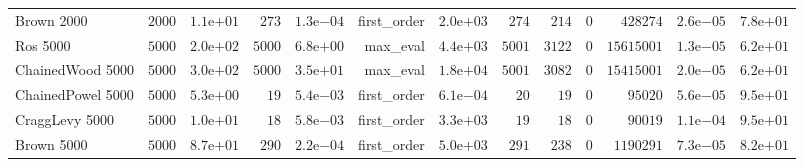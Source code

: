 \begin{longtable}[c]{lrrrrrrrrrrrr}
Brown 2000 & \( 2000\) & \( 1.1\)e\(+01\) & \(  273\) & \( 1.3\)e\(-04\) & first\_order & \( 2.0\)e\(+03\) & \(  274\) & \(  214\) & \(    0\) & \(428274\) & \( 2.6\)e\(-05\) & \( 7.8\)e\(+01\) \\
Ros 5000 & \( 5000\) & \( 2.0\)e\(+02\) & \( 5000\) & \( 6.8\)e\(+00\) & max\_eval & \( 4.4\)e\(+03\) & \( 5001\) & \( 3122\) & \(    0\) & \(15615001\) & \( 1.3\)e\(-05\) & \( 6.2\)e\(+01\) \\
ChainedWood 5000 & \( 5000\) & \( 3.0\)e\(+02\) & \( 5000\) & \( 3.5\)e\(+01\) & max\_eval & \( 1.8\)e\(+04\) & \( 5001\) & \( 3082\) & \(    0\) & \(15415001\) & \( 2.0\)e\(-05\) & \( 6.2\)e\(+01\) \\
ChainedPowel 5000 & \( 5000\) & \( 5.3\)e\(+00\) & \(   19\) & \( 5.4\)e\(-03\) & first\_order & \( 6.1\)e\(-04\) & \(   20\) & \(   19\) & \(    0\) & \(95020\) & \( 5.6\)e\(-05\) & \( 9.5\)e\(+01\) \\
CraggLevy 5000 & \( 5000\) & \( 1.0\)e\(+01\) & \(   18\) & \( 5.8\)e\(-03\) & first\_order & \( 3.3\)e\(+03\) & \(   19\) & \(   18\) & \(    0\) & \(90019\) & \( 1.1\)e\(-04\) & \( 9.5\)e\(+01\) \\
Brown 5000 & \( 5000\) & \( 8.7\)e\(+01\) & \(  290\) & \( 2.2\)e\(-04\) & first\_order & \( 5.0\)e\(+03\) & \(  291\) & \(  238\) & \(    0\) & \(1190291\) & \( 7.3\)e\(-05\) & \( 8.2\)e\(+01\) \\
\hline 
\end{longtable}
